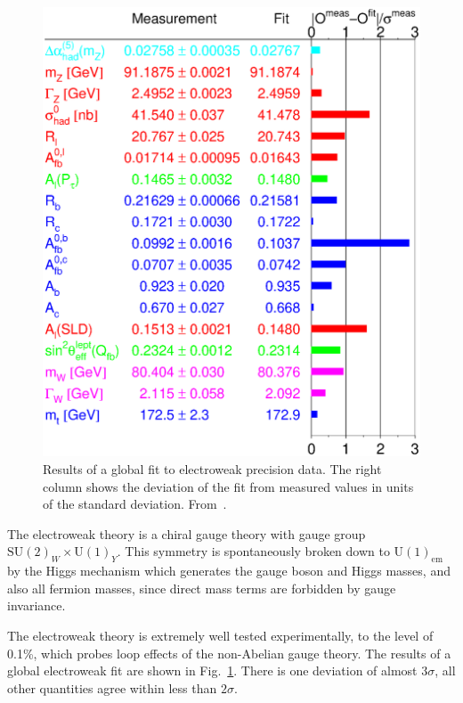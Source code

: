 \documentclass[12pt]{report}
\newcommand{\2}{\ensuremath{\sqrt{2}\,}}
\begin{document}
{      \begin{figure}
        \begin{center}
          \includegraphics[width=\textwidth]{w06_show_pull_18.eps}
        \end{center}
        \caption{\label{fig:ewfit}Results of a global fit to electroweak precision data. The right
          column shows the deviation of the fit from measured values in units of the standard
          deviation. From~\cite{ewwg}.} 
      \end{figure}
    
      The electroweak theory is a chiral gauge theory with gauge group
      $\mathrm{SU(2)}_W \times \mathrm{U(1)}_Y$. This symmetry is spontaneously broken down to 
      $\mathrm{U(1)}_\text{em}$ by the Higgs mechanism which generates the gauge boson and
      Higgs masses, and also  all
      fermion masses, since direct mass terms are forbidden by gauge invariance.

      The electroweak theory is extremely well tested experimentally, to the level of 0.1\%,
      which probes loop effects of the non-Abelian gauge theory. The
      results of a global electroweak fit are shown in Fig.~\ref{fig:ewfit}. There is one deviation
      of almost $3\sigma$, all other quantities agree within less than $2\sigma$.
      
}
\end{document}
